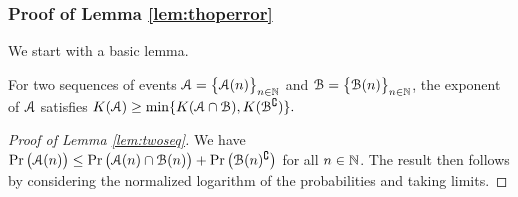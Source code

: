 \subsubsection{Proof of Lemma \ref{lem:thoperror}}
We start with a basic lemma. 
\begin{lemma}\label{lem:twoseq}
    For two sequences of events $\mathcal{A}=\big\{\mathcal{A}(n)\big\}_{n\in\mathbb{N}}$ and $\mathcal{B}=\big\{\mathcal{B}(n)\big\}_{n\in\mathbb{N}}$, the exponent of $\mathcal{A}$ satisfies
    $
        K ( \mathcal{A})\geq \min\{K ( \mathcal{A}\cap \mathcal{B}),K (\mathcal{B}^{\complement})\}.
    $
\end{lemma}
\begin{proof}[Proof of Lemma \ref{lem:twoseq}]
    We have
    $
	    \Pr\big(\mathcal{A}(n)\big)\le \Pr\big( \mathcal{A}(n)\cap \mathcal{B}(n)\big)+\Pr\big(\mathcal{B}(n)^{\complement}\big)
	$  for all $n\in\mathbb{N}$. The result then follows by considering  the normalized logarithm of the probabilities and taking limits. 
\end{proof}
